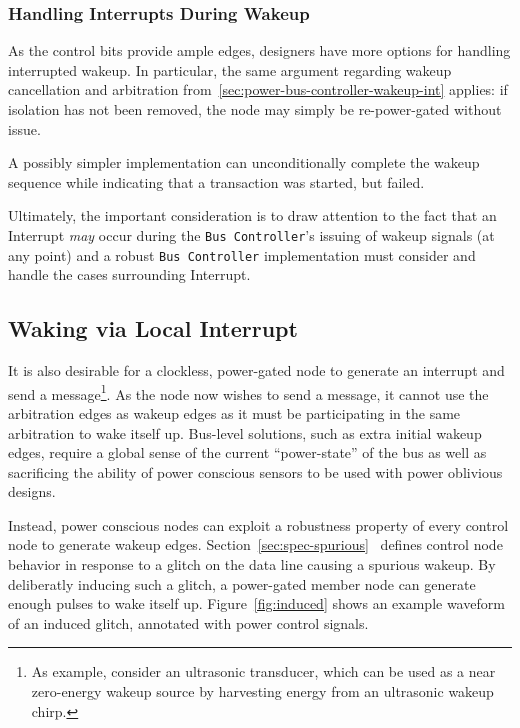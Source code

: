 \subsubsection{Handling Interrupts During Wakeup}
As the control bits provide ample edges, designers have more options for
handling interrupted wakeup. In particular, the same argument regarding wakeup
cancellation and arbitration from~\ref{sec:power-bus-controller-wakeup-int}
applies: if isolation has not been removed, the node may simply be
re-power-gated without issue.

A possibly simpler implementation can unconditionally complete the wakeup
sequence while indicating that a transaction was started, but failed.

Ultimately, the important consideration is to draw attention to the fact that
an Interrupt {\em may} occur during the {\tt Bus~Controller}'s issuing of
wakeup signals (at any point) and a robust {\tt Bus~Controller} implementation
must consider and handle the cases surrounding Interrupt.

\subsection{Waking via Local Interrupt}
It is also desirable for a clockless, power-gated \bus node to generate an
interrupt and send a message\footnote{
  As example, consider an ultrasonic transducer, which can be used as a near
  zero-energy wakeup source by harvesting energy from an ultrasonic wakeup
  chirp.}.
As the node now wishes to send a message, it cannot use the arbitration edges
as wakeup edges as it must be participating in the same arbitration to wake
itself up. Bus-level solutions, such as extra initial wakeup edges, require a
global sense of the current ``power-state'' of the bus as well as sacrificing
the ability of power conscious sensors to be used with power oblivious
designs.

Instead, power conscious nodes can exploit a robustness property of every \bus
control node to generate wakeup edges.
Section~\ref{sec:spec-spurious}~ defines control
node behavior in response to a glitch on the data line causing a spurious
wakeup. By deliberatly inducing such a glitch, a power-gated member node can
generate enough pulses to wake itself up. Figure~\ref{fig:induced} shows an
example waveform of an induced glitch, annotated with power control signals.

\begin{figure}
  \figTimingInducedGlitch
\end{figure}
